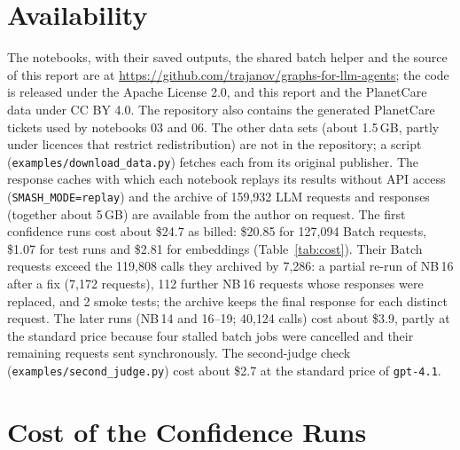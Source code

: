 \documentclass[11pt,a4paper]{article}
\newcommand{\nb}[1]{NB\,#1}
\begin{document}
\section*{Availability}
The notebooks, with their saved outputs, the shared batch helper and the source of this report are at
\url{https://github.com/trajanov/graphs-for-llm-agents}; the code is released under the Apache License 2.0, and this
report and the PlanetCare data under CC BY 4.0. The repository also contains the generated PlanetCare
tickets used by notebooks 03 and 06. The other data sets (about 1.5\,GB, partly under licences that restrict
redistribution) are not in the repository; a script (\texttt{examples/download\_data.py}) fetches each from its
original publisher. The response caches with which each notebook replays its results without API access
(\texttt{SMASH\_MODE=replay}) and the archive of 159{,}932 LLM requests and responses (together about 5\,GB) are
available from the author on request. The first confidence runs cost about \$24.7 as billed: \$20.85 for 127{,}094
Batch requests, \$1.07 for test runs and \$2.81 for embeddings (Table~\ref{tab:cost}). Their Batch requests exceed the
119{,}808 calls they archived by 7{,}286: a partial re-run of \nb{16} after a fix (7{,}172 requests), 112 further
\nb{16} requests whose responses were replaced, and 2 smoke tests; the archive keeps the final response for each
distinct request. The later runs (\nb{14} and 16--19; 40{,}124 calls) cost about \$3.9, partly at the standard price
because four stalled batch jobs were cancelled and their remaining requests sent synchronously. The second-judge
check (\texttt{examples/second\_judge.py}) cost about \$2.7 at the standard price of \texttt{gpt-4.1}.

\appendix
\section{Cost of the Confidence Runs}
\end{document}
